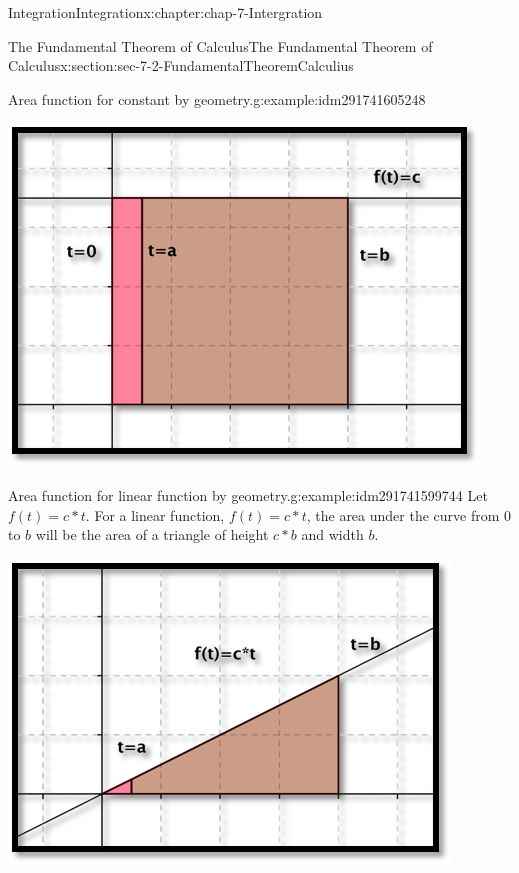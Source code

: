 \documentclass[oneside,10pt,]{book}
\numberwithin{equation}{section}
\begin{document}
\begin{chapterptx}{Integration}{}{Integration}{}{}{x:chapter:chap-7-Intergration}
\begin{sectionptx}{The Fundamental Theorem of Calculus}{}{The Fundamental Theorem of Calculus}{}{}{x:section:sec-7-2-FundamentalTheoremCalculius}
\begin{example}{Area function for constant by geometry.}{g:example:idm291741605248}
\begin{sidebyside}{1}{0.2}{0.2}{0}
\begin{sbspanel}{0.6}%
\includegraphics[width=\linewidth]{images/sec7-2-1.png}
\end{sbspanel}%
\end{sidebyside}%
\end{example}
\begin{example}{Area function for linear function by geometry.}{g:example:idm291741599744}%
Let \(f(t) = c*t\).  For a linear function, \(f(t) = c*t\), the area under the curve from 0 to \(b\) will be the area of a triangle of height \(c*b\) and width \(b\).%
\begin{sidebyside}{1}{0.2}{0.2}{0}%
\begin{sbspanel}{0.6}%
\includegraphics[width=\linewidth]{images/sec7-2-2.png}
\end{sbspanel}%

\end{sidebyside}
\end{example}
\end{sectionptx}
\end{chapterptx}
\end{document}
